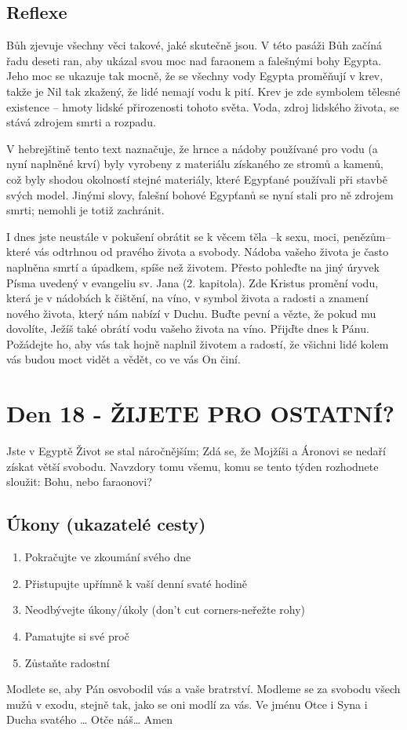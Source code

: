\documentclass[11pt]{article}
\newcommand{\zacatekTretiTyden}{
  Jste v Egyptě \newline
  Život se stal náročnějším; Zdá se, že Mojžíši a Áronovi se nedaří získat větší svobodu. Navzdory tomu všemu,
komu se tento týden rozhodnete sloužit: Bohu, nebo faraonovi?

\subsection*{Úkony (ukazatelé cesty)}
\begin{enumerate}
  \item Pokračujte ve zkoumání svého dne
  \item Přistupujte upřímně k vaší denní svaté hodině
  \item Neodbývejte úkony/úkoly (don’t cut corners-neřežte rohy)
  \item Pamatujte si své proč
  \item Zůstaňte radostní
\end{enumerate}
Modlete se, aby Pán osvobodil vás a vaše bratrství. \newline
Modleme se za svobodu všech mužů v exodu, stejně tak, jako se oni modlí za vás.\newline
Ve jménu Otce i Syna i Ducha svatého …  Otče náš… Amen
}
\begin{document}
\subsection*{Reflexe}

Bůh zjevuje všechny věci takové, jaké skutečně jsou. V této pasáži Bůh začíná řadu deseti ran, aby ukázal svou
moc nad faraonem a falešnými bohy Egypta. Jeho moc se ukazuje tak mocně, že se všechny vody Egypta
proměňují v krev, takže je Nil tak zkažený, že lidé nemají vodu k pití. Krev je zde symbolem tělesné existence –
hmoty lidské přirozenosti tohoto světa. Voda, zdroj lidského života, se stává zdrojem smrti a rozpadu.

V hebrejštině tento text naznačuje, že hrnce a nádoby používané pro vodu (a nyní naplněné krví) byly vyrobeny z
materiálu získaného ze stromů a kamenů, což byly shodou okolností stejné materiály, které Egypťané používali při
stavbě svých model. Jinými slovy, falešní bohové Egypťanů se nyní stali pro ně zdrojem smrti; nemohli je totiž
zachránit.

I dnes jste neustále v pokušení obrátit se k věcem těla –k sexu, moci, penězům– které vás odtrhnou od pravého
života a svobody. Nádoba vašeho života je často naplněna smrtí a úpadkem, spíše než životem. Přesto pohleďte na
jiný úryvek Písma uvedený v evangeliu sv. Jana (2. kapitola). Zde Kristus promění vodu, která je v nádobách k
čištění, na víno, v symbol života a radosti a znamení nového života, který nám nabízí v Duchu. Buďte pevní a
vězte, že pokud mu dovolíte, Ježíš také obrátí vodu vašeho života na víno. Přijďte dnes k Pánu. Požádejte ho, aby
vás tak hojně naplnil životem a radostí, že všichni lidé kolem vás budou moct vidět a vědět, co ve vás On činí.

\newpage
\section{Den 18 - ŽIJETE PRO OSTATNÍ?}
\zacatekTretiTyden
\end{document}
